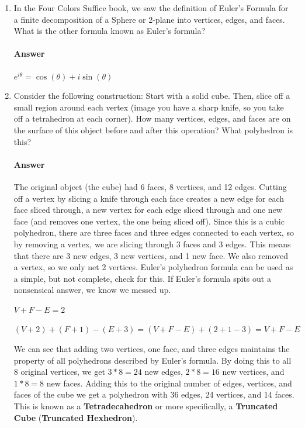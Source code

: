 \documentclass{article}
\begin{document}
\begin{enumerate}

    \item In the Four Colors Suffice book, we saw the definition of Euler's
        Formula for a finite decomposition of a Sphere or 2-plane into vertices,
        edges, and faces.  What is the other formula known as Euler's formula?

        \paragraph{Answer}
	$e^{i \theta}=\cos(\theta) + i \sin(\theta)$



    \item  Consider the following construction: Start with a solid cube.  Then, slice
        off a small region around each vertex (image you have a sharp knife, so you take
        off a tetrahedron at each corner).  How many vertices, edges, and faces are on
        the surface of this object before and after this operation? What polyhedron is this?

        \paragraph{Answer}
        The original object (the cube) had 6 faces, 8 vertices, and 12 edges. Cutting off a vertex by slicing a knife through each face
        creates a new edge for each face sliced through, a new vertex for each edge sliced through and one new face (and removes one vertex, the one being sliced off). Since this is a cubic polyhedron, there are three faces and three edges connected to each vertex, so by removing a vertex, we are slicing through 3 faces and 3 edges. This means that there are 3 new edges, 3 new vertices, and 1 new face. We also removed a vertex, so we only net 2 vertices. Euler's polyhedron formula can be used as a simple, but not complete, check for this. If Euler's formula spits out a nonsensical answer, we know we messed up.
        
        $V + F-E=2$
        
        $(V+2)+(F+1)-(E+3)=(V+F-E)+(2+1-3)=V+F-E$
        
        We can see that adding two vertices, one face, and three edges maintains the property of all polyhedrons described by Euler's formula. By doing this to all 8 original vertices, we get $3*8=24$ new edges, $2*8=16$ new vertices, and $1*8=8$
        new faces. Adding this to the original number of edges, vertices, and faces of the cube we get a polyhedron with 36 edges, 24 vertices, and 14 faces. This is known as a \textbf{Tetradecahedron} or more specifically, a \textbf{Truncated Cube} (\textbf{Truncated Hexhedron}).






\end{enumerate}
\end{document}
